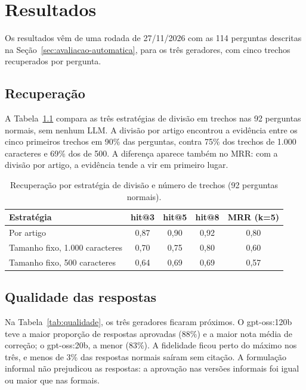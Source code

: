 \chapter{Resultados}
\label{cap:resultados}

Os resultados vêm de uma rodada de 27/11/2026 com as 114 perguntas descritas na
Seção~\ref{sec:avaliacao-automatica}, para os três geradores, com cinco trechos
recuperados por pergunta.

\section{Recuperação}

A Tabela~\ref{tab:grade} compara as três estratégias de divisão em trechos nas 92
perguntas normais, sem nenhum LLM. A divisão por artigo encontrou a evidência entre os
cinco primeiros trechos em 90\% das perguntas, contra 75\% dos trechos de 1.000 caracteres
e 69\% dos de 500. A diferença aparece também no MRR: com a divisão por artigo, a
evidência tende a vir em primeiro lugar.

\begin{table}[htb]
\centering
\caption{Recuperação por estratégia de divisão e número de trechos (92 perguntas normais).}
\label{tab:grade}
\begin{tabular}{lcccc}
\toprule
\textbf{Estratégia} & \textbf{hit@3} & \textbf{hit@5} & \textbf{hit@8} & \textbf{MRR (k=5)} \\
\midrule
Por artigo & 0,87 & 0,90 & 0,92 & 0,80 \\
Tamanho fixo, 1.000 caracteres & 0,70 & 0,75 & 0,80 & 0,60 \\
Tamanho fixo, 500 caracteres & 0,64 & 0,69 & 0,69 & 0,57 \\
\bottomrule
\end{tabular}
\end{table}

\section{Qualidade das respostas}

Na Tabela~\ref{tab:qualidade}, os três geradores ficaram próximos. O gpt-oss:120b teve a
maior proporção de respostas aprovadas (88\%) e a maior nota média de correção; o
gpt-oss:20b, a menor (83\%). A fidelidade ficou perto do máximo nos três, e menos de 3\%
das respostas normais saíram sem citação. A formulação informal não prejudicou as
respostas: a aprovação nas versões informais foi igual ou maior que nas formais.

